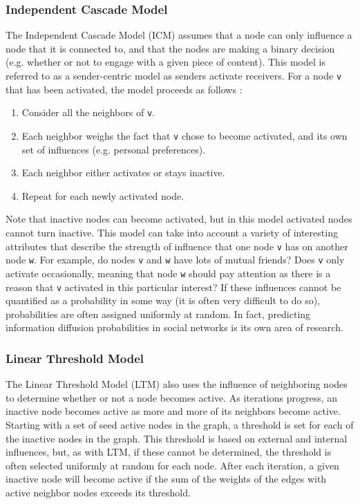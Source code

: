 \subsubsection{Independent Cascade Model}
The Independent Cascade Model (ICM) assumes that a node can only influence a node that it is connected to, and that the nodes are making a binary decision (e.g. whether or not to engage with a given piece of content).  This model is referred to as a sender-centric model as senders activate receivers.  For a node \texttt{v} that has been activated, the model proceeds as follows \cite{lisurvey}:
\begin{enumerate}
	\item Consider all the neighbors of \texttt{v}.
	\item Each neighbor weighs the fact that \texttt{v} chose to become activated, and its own set of influences (e.g. personal preferences).
	\item Each neighbor either activates or stays inactive.
	\item Repeat for each newly activated node.
\end{enumerate}
Note that inactive nodes can become activated, but in this model activated nodes cannot turn inactive.  This model can take into account a variety of interesting attributes that describe the strength of influence that one node \texttt{v} has on another node \texttt{w}.  For example, do nodes \texttt{v} and \texttt{w} have lots of mutual friends?  Does \texttt{v} only activate occasionally, meaning that node \texttt{w} should pay attention as there is a reason that \texttt{v} activated in this particular interest?  If these influences cannot be quantified as a probability in some way (it is often very difficult to do so), probabilities are often assigned uniformly at random.  In fact, predicting information diffusion probabilities in social networks is its own area of research.
\subsubsection{Linear Threshold Model}
The Linear Threshold Model (LTM) also uses the influence of neighboring nodes to determine whether or not a node becomes active.  As iterations progress, an inactive node becomes active as more and more of its neighbors become active.  Starting with a set of seed active nodes in the graph, a threshold is set for each of the inactive nodes in the graph.  This threshold is based on external and internal influences, but, as with LTM, if these cannot be determined, the threshold is often selected uniformly at random for each node.  After each iteration, a given inactive node will become active if the sum of the weights of the edges with active neighbor nodes exceeds its threshold.

